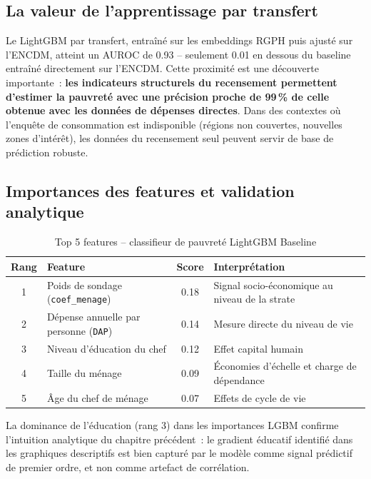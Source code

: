 \documentclass[12pt,a4paper]{report}
\begin{document}
\subsection{La valeur de l'apprentissage par transfert}

Le LightGBM par transfert, entraîné sur les embeddings RGPH puis ajusté sur l'ENCDM, atteint un AUROC de 0.93 -- seulement 0.01 en dessous du baseline entraîné directement sur l'ENCDM. Cette proximité est une découverte importante~: \textbf{les indicateurs structurels du recensement permettent d'estimer la pauvreté avec une précision proche de 99\,\% de celle obtenue avec les données de dépenses directes}. Dans des contextes où l'enquête de consommation est indisponible (régions non couvertes, nouvelles zones d'intérêt), les données du recensement seul peuvent servir de base de prédiction robuste.

\subsection{Importances des features et validation analytique}

\begin{table}[H]
\centering
\small
\caption{Top 5 features -- classifieur de pauvreté LightGBM Baseline}
\label{tab:feature_importance}
\begin{tabularx}{\textwidth}{@{}c l c >{\raggedright\arraybackslash}X@{}}
\toprule
\textbf{Rang} & \textbf{Feature} & \textbf{Score} & \textbf{Interprétation} \\
\midrule
1 & Poids de sondage (\texttt{coef\_menage}) & 0.18 & Signal socio-économique au niveau de la strate \\
2 & Dépense annuelle par personne (\texttt{DAP}) & 0.14 & Mesure directe du niveau de vie \\
3 & Niveau d'éducation du chef & 0.12 & Effet capital humain \\
4 & Taille du ménage & 0.09 & Économies d'échelle et charge de dépendance \\
5 & Âge du chef de ménage & 0.07 & Effets de cycle de vie \\
\bottomrule
\end{tabularx}
\end{table}

La dominance de l'éducation (rang 3) dans les importances LGBM confirme l'intuition analytique du chapitre précédent~: le gradient éducatif identifié dans les graphiques descriptifs est bien capturé par le modèle comme signal prédictif de premier ordre, et non comme artefact de corrélation.
\end{document}
